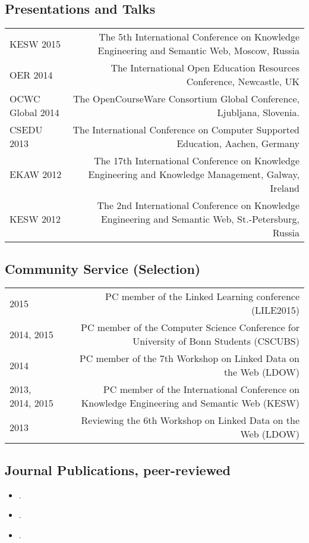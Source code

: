 \subsection*{Presentations and Talks}
\begin{tabular}{L!{\VRule}R}
KESW 2015 & The 5th International Conference on Knowledge Engineering and Semantic Web, Moscow, Russia\\
OER 2014 & The International Open Education Resources Conference, Newcastle, UK \\
OCWC Global 2014 & The OpenCourseWare Consortium Global Conference, Ljubljana, Slovenia. \\
CSEDU 2013 & The International Conference on Computer Supported Education, Aachen, Germany\\
EKAW 2012 & The 17th International Conference on Knowledge Engineering and Knowledge Management, Galway, Ireland\\
KESW 2012 & The 2nd International Conference on Knowledge Engineering and Semantic Web, St.-Petersburg, Russia\\

\end{tabular}

\subsection*{Community Service (Selection)}
\begin{tabular}{L!{\VRule}R}
2015 & PC member of the Linked Learning conference (LILE2015)\\
2014, 2015 & PC member of the Computer Science Conference for University of Bonn Students (CSCUBS)\\
2014 & PC member of the 7th Workshop on Linked Data on the Web (LDOW)\\
2013, 2014, 2015 & PC member of the International Conference on Knowledge Engineering and Semantic Web (KESW)\\
2013 & Reviewing the 6th Workshop on Linked Data on the Web (LDOW)\\
\end{tabular}

\subsection*{Journal Publications, peer-reviewed}

\begin{itemize}
\item {}.
\item {}.
\item {}.
\end{itemize}

